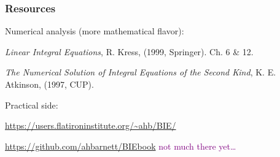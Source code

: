 \documentclass[t]{beamer}
\newcommand{\ft}[1]{\frametitle{#1}}
\newcommand{\com}[1]{{\scriptsize \textcolor{purple}{#1}}}      %
\begin{document}
\begin{frame}\ft{}
\end{frame}

\begin{frame}\ft{}
\end{frame}

\begin{frame}\ft{}
\end{frame}

\begin{frame}\ft{}
\end{frame}

\begin{frame}\ft{}
\end{frame}

\begin{frame}\ft{}
\end{frame}


\begin{frame}\ft{}
\end{frame}


\begin{frame}\ft{Resources}

Numerical analysis (more mathematical flavor):
  
{\em Linear Integral Equations}, R. Kress, (1999, Springer). Ch. 6 \& 12.

{\em The Numerical Solution of Integral Equations of the Second Kind},
K. E. Atkinson, (1997, CUP).

Practical side:

\url{https://users.flatironinstitute.org/~ahb/BIE/}

\url{https://github.com/ahbarnett/BIEbook} \hfill \com{not much there yet\dots}

\end{frame}
\end{document}
